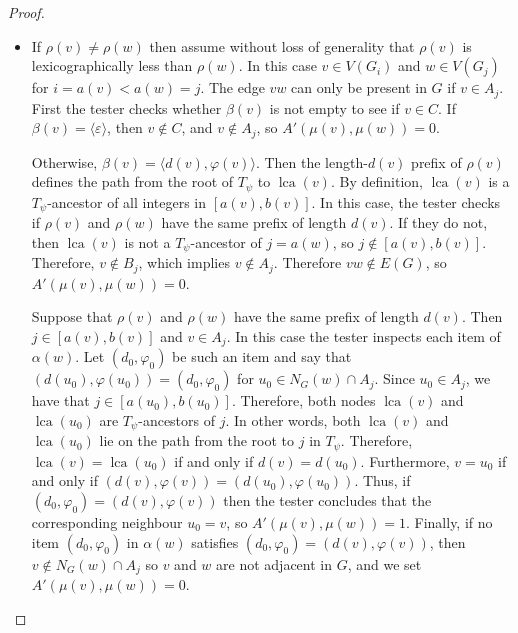 \documentclass[twoside,leqno]{article}
\DeclareMathOperator{\lca}{lca}
\begin{document}
\begin{proof}
\begin{itemize}
    \item If $\rho(v)\neq\rho(w)$ then assume without loss of generality that $\rho(v)$ is lexicographically less than $\rho(w)$. In this case $v\in V(G_i)$ and $w\in V(G_j)$ for $i=a(v)<a(w)=j$. The edge $vw$ can only be present in $G$ if $v\in A_j$. First the tester checks whether $\beta(v)$ is not empty to see if $v\in C$. If $\beta(v)=\langle\varepsilon\rangle$, then $v\not\in C$, and  $v\not\in A_j$, so $A'(\mu(v),\mu(w))=0$.

          Otherwise, $\beta(v)=\langle d(v),\varphi(v)\rangle$.  Then the length-$d(v)$ prefix of $\rho(v)$ defines the path from the root of $T_\psi$ to $\lca(v)$.  By definition, $\lca(v)$ is a $T_\psi$-ancestor of all integers in $[a(v),b(v)]$. In this case, the tester checks if $\rho(v)$ and $\rho(w)$ have the same prefix of length $d(v)$.  If they do not, then $\lca(v)$ is not a $T_\psi$-ancestor of $j=a(w)$, so $j\not\in[a(v),b(v)]$.  Therefore, $v\not\in B_{j}$, which implies $v\not\in A_j$. Therefore $vw\not\in E(G)$, so $A'(\mu(v),\mu(w))=0$.

          Suppose that $\rho(v)$ and $\rho(w)$ have the same prefix of length $d(v)$.  Then $j\in [a(v),b(v)]$ and $v\in A_j$. In this case the tester inspects each item of $\alpha(w)$. Let $(d_0,\varphi_0)$ be such an item and say that $(d(u_0),\varphi(u_0))=(d_0,\varphi_0)$ for $u_0 \in N_G(w)\cap A_j$. Since $u_0 \in A_j$, we have that $j\in[a(u_0),b(u_0)]$. Therefore, both nodes $\lca(v)$ and $\lca(u_0)$ are $T_\psi$-ancestors of $j$. In other words, both $\lca(v)$ and $\lca(u_0)$ lie on the path from the root to $j$ in $T_{\psi}$. Therefore, $\lca(v)=\lca(u_0)$ if and only if $d(v)=d(u_0)$. Furthermore, $v=u_0$ if and only if $(d(v),\varphi(v))=(d(u_0),\varphi(u_0))$. Thus, if $(d_0,\varphi_0)=(d(v),\varphi(v))$ then the tester concludes that the corresponding neighbour $u_0=v$, so $A'(\mu(v),\mu(w))=1$. Finally, if no item $(d_0,\varphi_0)$ in $\alpha(w)$ satisfies $(d_0,\varphi_0)=(d(v),\varphi(v))$, then $v\not\in N_G(w)\cap A_j$ so $v$ and $w$ are not adjacent in $G$, and we set $A'(\mu(v),\mu(w))=0$.
  \end{itemize}


\end{proof}
\end{document}
